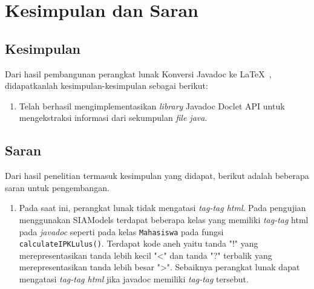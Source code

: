 \chapter{Kesimpulan dan Saran}
\label{sec:kesimpulan dan saran}

\section{Kesimpulan}
\label{sec:kesimpulan}
Dari hasil pembangunan perangkat lunak Konversi Javadoc ke \LaTeX\ , didapatkanlah kesimpulan-kesimpulan sebagai berikut:
\begin{enumerate}
	\item Telah berhasil mengimplementasikan {\it library} Javadoc Doclet API untuk mengekstraksi informasi dari sekumpulan {\it file java}.
\end{enumerate}

\section{Saran}
\label{sec:saran}
Dari hasil penelitian termasuk kesimpulan yang didapat, berikut adalah beberapa saran untuk pengembangan.
\begin{enumerate}
	\item Pada saat ini, perangkat lunak tidak mengatasi {\it tag-tag html}. Pada pengujian menggunakan SIAModels terdapat beberapa kelas yang memiliki {\it tag-tag} html pada {\it javadoc} seperti pada kelas {\tt Mahasiswa} pada fungsi {\tt calculateIPKLulus()}. Terdapat kode aneh yaitu tanda "!" yang merepresentasikan tanda lebih kecil "<" dan tanda "?" terbalik yang merepresentasikan tanda lebih besar ">". Sebaiknya perangkat lunak dapat mengatasi {\it tag-tag html} jika javadoc memiliki {\it tag-tag} tersebut.
\end{enumerate}
